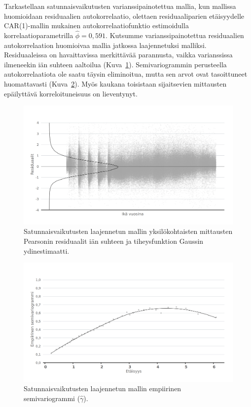 \documentclass[finnish]{docopts}
\begin{document}
Tarkastellaan satunnaisvaikutusten varianssipainotettua mallia, kun mallissa huomioidaan residuaalien autokorrelaatio, olettaen residuaaliparien etäisyydelle CAR(1)-mallin mukainen autokorrelaatiofunktio estimoidulla korrelaatioparametrilla $\hat{\phi} = 0,591$. Kutsumme varianssipainotettua residuaalien autokorrelaation huomioivaa mallia jatkossa laajennetuksi malliksi.\\

Residuaaleissa on havaittavissa merkittävää parannusta, vaikka varianssissa ilmeneekin iän suhteen aaltoilua (Kuva~\ref{fig:lme2_ika_vc_resid}). Semivariogrammin perusteella autokorrelaatiota ole saatu täysin eliminoitua, mutta sen arvot ovat tasoittuneet huomattavasti (Kuva~\ref{fig:lme2_vc_vario}). Myös kaukana toisistaan sijaitsevien mittausten epäilyttävä korreloituneisuus on lieventynyt.\\

\begin{figure}[H]
\centering
  \includegraphics[scale=0.8]{kuvaajat/lme2_ika_vc_residuaalit.png}
  \caption{Satunnaisvaikutusten laajennetun mallin yksilökohtaisten mittausten Pearsonin residuaalit iän suhteen ja tiheysfunktion Gaussin ydinestimaatti.}
  \label{fig:lme2_ika_vc_resid}
\end{figure}

\begin{figure}[H]
\centering
  \includegraphics[scale=0.8]{kuvaajat/lme2_vc_vario.png}
  \caption{Satunnaisvaikutusten laajennetun mallin empiirinen semivariogrammi ($\hat{\gamma}$).}
  \label{fig:lme2_vc_vario}
\end{figure}
\end{document}
